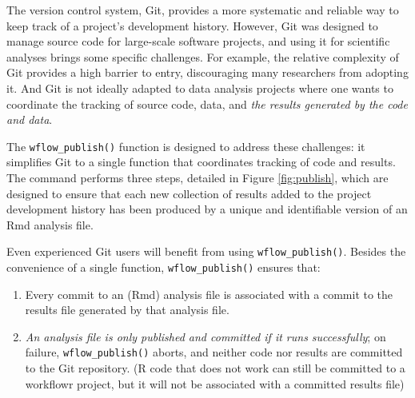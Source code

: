 \documentclass[9pt,a4paper]{extarticle}
\begin{document}
The version control system, Git, provides a more systematic and reliable
way to keep track of a project's development history. However, Git was
designed to manage source code for large-scale software projects, and
using it for scientific analyses brings some specific challenges. For
example, the relative complexity of Git provides a high barrier to
entry, discouraging many researchers from adopting it. And Git is not
ideally adapted to data analysis projects where one wants to coordinate
the tracking of source code, data, and \textit{the results generated by
the code and data}.

The \texttt{wflow\_publish()} function is designed to address these challenges: it
simplifies Git to a single function that coordinates tracking of code
and results. The command performs three steps, detailed in Figure \ref{fig:publish},
which are designed to ensure that each new collection of results added
to the project development history has been produced by a unique and
identifiable version of an Rmd analysis file.

Even experienced Git users will benefit from using \texttt{wflow\_publish()}.
Besides the convenience of a single function, \texttt{wflow\_publish()} ensures
that:

\begin{enumerate}

\item Every commit to an (Rmd) analysis file is associated with a commit
to the results file generated by that analysis file.

\item \textit{An analysis file is only published and committed if it
runs successfully}; on failure, \texttt{wflow\_publish()} aborts, and neither code
nor results are committed to the Git repository. (R code that does not
work can still be committed to a workflowr project, but it will not be
associated with a committed results file)

\end{enumerate}
\end{document}
